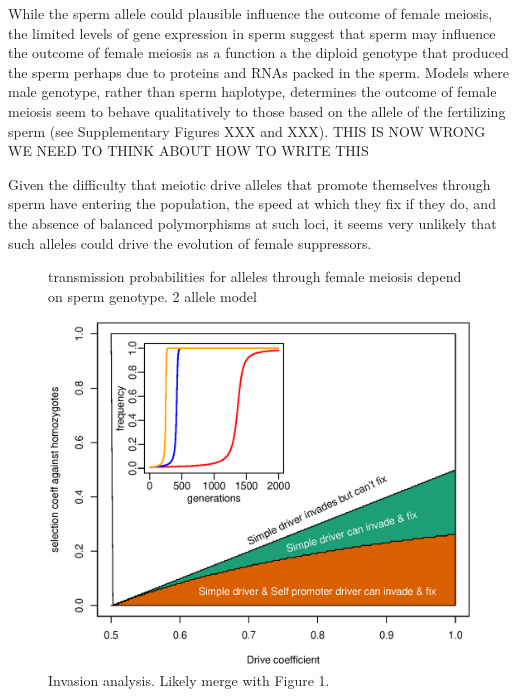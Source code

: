 \documentclass[12pt,letterpaper]{article}
\newcommand{\yb}[1]{{ \color{blue} #1}}
\begin{document}
While the sperm allele  could plausible influence the outcome of female meiosis, the limited levels of gene expression in sperm 
	suggest that sperm may influence the outcome of female meiosis as a function a the diploid genotype that produced the sperm perhaps due to proteins and RNAs packed in the sperm.
Models where male genotype, rather than sperm haplotype, determines the outcome of female meiosis 
	seem to behave qualitatively to those based on the allele of the
	fertilizing sperm (see Supplementary Figures XXX and XXX).
	\yb{THIS IS NOW WRONG WE NEED TO THINK ABOUT HOW TO WRITE THIS}



Given the difficulty that meiotic drive alleles that promote themselves
through sperm have entering the population, the speed at
which they fix if they do, \yb{and the absence of balanced polymorphisms at such loci,} it seems very unlikely that such alleles
could drive the evolution of female \yb{suppressors}.

\begin{figure}
\caption{transmission probabilities for alleles through female
  meiosis depend on sperm genotype. 2 allele model}  
\label{Eggsperm_2_allele_cartoon}
\end{figure}

\begin{figure}
\includegraphics[width = 0.8 \textwidth]{Figures/invasion_space_recessive_driver.eps}
\caption{Invasion analysis. Likely merge with Figure 1.} \label{Invasion_space}
\end{figure}
\end{document}
